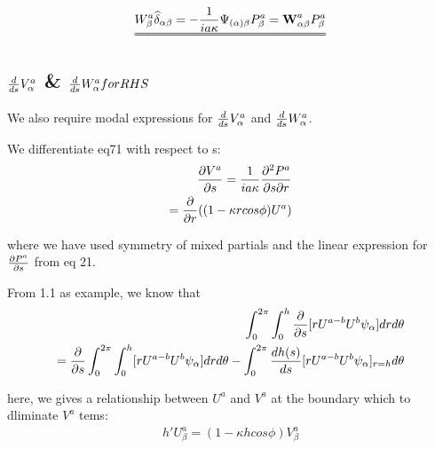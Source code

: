 \documentclass{Note}
\begin{document}
\begin{equation}
\begin{aligned}
\uuline{W_\beta^a \widehat{\delta }_{\alpha\beta}=-{1\over {i a \kappa}}\Psi_{(\alpha)\beta}P_\beta^a=\textbf{W}_{\alpha\beta}^a P_\beta^a}
\end{aligned}
\end{equation}

\subsection{ ${d\over ds}V_\alpha^a$  \& ${d\over ds}W_\alpha^a for RHS$}
We also require modal expressions for ${d\over ds}V_\alpha^a$ and ${d\over ds}W_\alpha^a$.

We differentiate eq71 with respect to s:
\begin{equation}
\begin{aligned}
{\partial V^a \over \partial s}={1\over {ia\kappa }}{\partial^2 P^a \over \partial s\partial r}\\
={\partial \over \partial r}((1-\kappa r cos\phi)U^a)
\end{aligned}
\end{equation}

where we have used symmetry of mixed partials and the linear expression for $\partial P^a\over \partial s$ from eq 21.

From 1.1 as example, we know that
\begin{equation}
\begin{aligned}
\int_0^{2\pi}\int_0^h   {{\partial }\over {\partial s}}[ {r U^{a-b}} U^b\psi_\alpha] dr d\theta \\
={{\partial }\over {\partial s}}\int_0^{2\pi}\int_0^h   [ {r U^{a-b}} U^b\psi_\alpha] dr d\theta 
-\int_0^{2\pi}{dh(s)\over ds}[ {r U^{a-b}} U^b\psi_\alpha]_{r=h}d\theta\\
\end{aligned}
\end{equation}

here, we gives a relationship between $U^a$ and $V^a$ at the boundary which to dliminate $V^a$ tems:
\begin{equation}
\begin{aligned}
{h'U_\beta^{a}}={(1-\kappa h cos \phi)}V_\beta^{a}
\end{aligned}
\end{equation}
\end{document}
